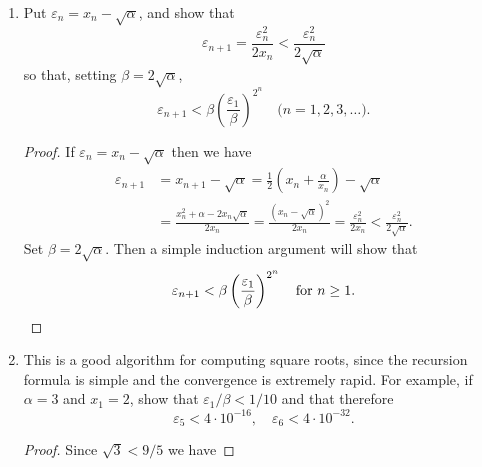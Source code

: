 \begin{enumerate}
\begin{proof}
    Now, since $\{x_n\}$ is a monotonic sequence that is bounded below
    by $\sqrt\alpha$, it must converge to some value $x$. Then we have
    \begin{equation*}
      x = \lim_{n\to\infty}x_n
      = \lim_{n\to\infty}\frac12\left(x_n + \frac\alpha{x_n}\right)
      = \frac12\left(x + \frac\alpha{x}\right).
    \end{equation*}
    So $2x = x + \alpha/x$ hence $x = \sqrt\alpha$.
  \end{proof}
\item Put $\varepsilon_n = x_n - \sqrt\alpha$, and show that
  \begin{equation*}
    \varepsilon_{n+1} = \frac{\varepsilon_n^2}{2x_n}
    < \frac{\varepsilon_n^2}{2\sqrt\alpha}
  \end{equation*}
  so that, setting $\beta = 2\sqrt\alpha$,
  \begin{equation*}
    \varepsilon_{n+1}<\beta\left(\frac{\varepsilon_1}\beta\right)^{2^n}
    \quad\text{($n = 1,2,3,\dots$)}.
  \end{equation*}
  \begin{proof}
    If $\varepsilon_n = x_n - \sqrt\alpha$ then we have
    \begin{align*}
      \varepsilon_{n+1}
      &= x_{n+1} - \sqrt\alpha
      = \frac12\left(x_n + \frac\alpha{x_n}\right) - \sqrt\alpha \\
      &= \frac{x_n^2 + \alpha - 2x_n\sqrt\alpha}{2x_n}
      = \frac{(x_n - \sqrt\alpha)^2}{2x_n}
      = \frac{\varepsilon_n^2}{2x_n} < \frac{\varepsilon_n^2}{2\sqrt\alpha}.
    \end{align*}
    Set $\beta = 2\sqrt\alpha$. Then a simple induction argument will
    show that
    \begin{equation*}
      \varepsilon_{n+1} < \beta\left(\frac{\varepsilon_1}\beta\right)^{2^n}
      \quad\text{for $n\geq1$}. \qedhere
    \end{equation*}
  \end{proof}
\item This is a good algorithm for computing square roots, since the
  recursion formula is simple and the convergence is extremely
  rapid. For example, if $\alpha = 3$ and $x_1 = 2$, show that
  $\varepsilon_1/\beta < 1/10$ and that therefore
  \begin{equation*}
    \varepsilon_5 < 4\cdot10^{-16},
    \quad\varepsilon_6 < 4\cdot10^{-32}.
  \end{equation*}
  \begin{proof}
    Since $\sqrt3 < 9/5$ we have

\end{proof}
\end{enumerate}
